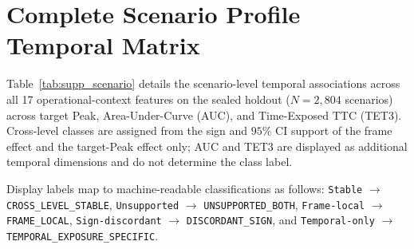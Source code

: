 \section{Complete Scenario Profile Temporal Matrix}
\label{sec:supp_scenario}

Table~\ref{tab:supp_scenario} details the scenario-level temporal associations across all 17 operational-context features on the sealed holdout ($N=2,804$ scenarios) across target Peak, Area-Under-Curve (AUC), and Time-Exposed TTC (TET3). Cross-level classes are assigned from the sign and $95\%$ CI support of the frame effect and the target-Peak effect only; AUC and TET3 are displayed as additional temporal dimensions and do not determine the class label.

Display labels map to machine-readable classifications as follows:
\texttt{Stable} $\to$ \texttt{CROSS\_LEVEL\_STABLE},
\texttt{Unsupported} $\to$ \texttt{UNSUPPORTED\_BOTH},
\texttt{Frame-local} $\to$ \texttt{FRAME\_LOCAL},
\texttt{Sign-discordant} $\to$ \texttt{DISCORDANT\_SIGN}, and
\texttt{Temporal-only} $\to$ \texttt{TEMPORAL\_EXPOSURE\_SPECIFIC}.

